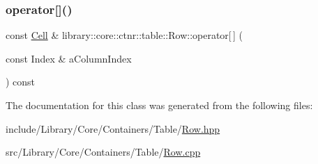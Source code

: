 \mbox{\label{classlibrary_1_1core_1_1ctnr_1_1table_1_1_row_a8fd76f9562104b7d92b91a8774609e6f}} 
\subsubsection{\texorpdfstring{operator[]()}{operator[]()}}
{\footnotesize\ttfamily const \hyperlink{namespacelibrary_1_1core_1_1ctnr_1_1table_aac6007d595b2967513e8e6b89f6092f5}{Cell} \& library\+::core\+::ctnr\+::table\+::\+Row\+::operator\mbox{[}$\,$\mbox{]} (\begin{DoxyParamCaption}\item[{const Index \&}]{a\+Column\+Index }\end{DoxyParamCaption}) const}



The documentation for this class was generated from the following files\+:\begin{DoxyCompactItemize}
\item 
include/\+Library/\+Core/\+Containers/\+Table/\hyperlink{_row_8hpp}{Row.\+hpp}\item 
src/\+Library/\+Core/\+Containers/\+Table/\hyperlink{_row_8cpp}{Row.\+cpp}\end{DoxyCompactItemize}
